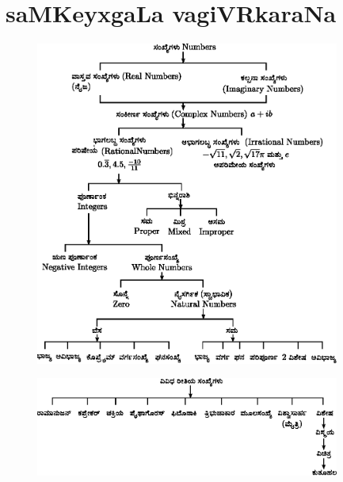 \chapter{saMKeyxgaLa vagiVRkaraNa}
\vskip-20pt

\begin{figure}[h]
\includegraphics[width=10cm]{src/figure/165.eps}
\end{figure}

\begin{figure}[h]
\includegraphics[width=10cm]{src/figure/166.eps}
\end{figure}
